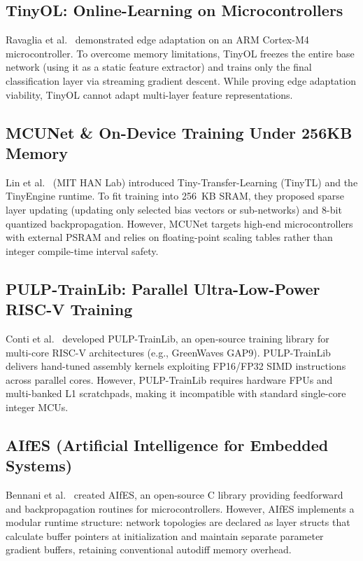 \documentclass[12pt,a4paper]{report}
\begin{document}
\subsection{TinyOL: Online-Learning on Microcontrollers}
Ravaglia et al.~\cite{ravaglia2022tinyol} demonstrated edge adaptation on an ARM Cortex-M4 microcontroller. To overcome memory limitations, TinyOL freezes the entire base network (using it as a static feature extractor) and trains only the final classification layer via streaming gradient descent. While proving edge adaptation viability, TinyOL cannot adapt multi-layer feature representations.

\subsection{MCUNet \& On-Device Training Under 256KB Memory}
Lin et al.~\cite{lin2022ondevice} (MIT HAN Lab) introduced Tiny-Transfer-Learning (TinyTL) and the TinyEngine runtime. To fit training into 256~KB SRAM, they proposed sparse layer updating (updating only selected bias vectors or sub-networks) and 8-bit quantized backpropagation. However, MCUNet targets high-end microcontrollers with external PSRAM and relies on floating-point scaling tables rather than integer compile-time interval safety.

\subsection{PULP-TrainLib: Parallel Ultra-Low-Power RISC-V Training}
Conti et al.~\cite{conti2023pulp} developed PULP-TrainLib, an open-source training library for multi-core RISC-V architectures (e.g., GreenWaves GAP9). PULP-TrainLib delivers hand-tuned assembly kernels exploiting FP16/FP32 SIMD instructions across parallel cores. However, PULP-TrainLib requires hardware FPUs and multi-banked L1 scratchpads, making it incompatible with standard single-core integer MCUs.

\subsection{AIfES (Artificial Intelligence for Embedded Systems)}
Bennani et al.~\cite{aifes2022} created AIfES, an open-source C library providing feedforward and backpropagation routines for microcontrollers. However, AIfES implements a modular runtime structure: network topologies are declared as layer structs that calculate buffer pointers at initialization and maintain separate parameter gradient buffers, retaining conventional autodiff memory overhead.
\end{document}
